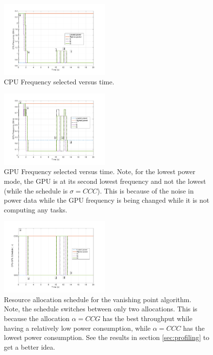  
\begin{figure}[hbtp]
\centering
\includegraphics[width=0.49\textwidth]{../simulations/figs/CPUF.pdf}
\caption{CPU Frequency selected versus time.}
\label{fig:cpuf} 
\end{figure}


\begin{figure}[hbtp]
\centering
\includegraphics[width=0.49\textwidth]{../simulations/figs/GPUF.pdf}
\caption{GPU Frequency selected versus time. Note, for the lowest power mode, the GPU is at its second lowest frequency and not the lowest (while the schedule is $\sigma=CCC$). This is because of the noise in power data while the GPU frequency is being changed while it is not computing any tasks.}
\label{fig:gpuf} 
\end{figure}


\begin{figure}[hbtp]
\centering
\includegraphics[width=0.49\textwidth]{../simulations/figs/schedule.pdf}
\caption{Resource allocation schedule for the vanishing point algorithm. Note, the schedule switches between only two allocations. This is because the allocation $\alpha=CCG$ has the best throughput while having a relatively low power consumption, while $\alpha=CCC$ has the lowest power consumption. See the results in section \ref{sec:profiling} to get a better idea.}
\label{fig:schedule} 
\end{figure}

